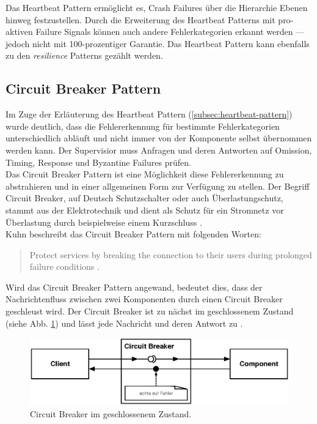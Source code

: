Das Heartbeat Pattern ermöglicht es, Crash Failures über die Hierarchie Ebenen hinweg festzustellen. Durch die Erweiterung des Heartbeat Patterns mit pro-aktiven Failure Signals können auch andere Fehlerkategorien erkannt werden --- jedoch nicht mit 100-prozentiger Garantie. Das Heartbeat Pattern kann ebenfalls zu den \textit{resilience} Patterns gezählt werden. 

\pagebreak

\subsection{Circuit Breaker Pattern}\label{subsec:circuit-breaker-pattern}
Im Zuge der Erläuterung des Heartbeat Pattern (\ref{subsec:heartbeat-pattern}) wurde deutlich, dass die Fehlererkennung für bestimmte Fehlerkategorien unterschiedlich abläuft und nicht immer von der Komponente selbst übernommen werden kann. Der Supervisior muss Anfragen und deren Antworten auf Omission, Timing, Response und Byzantine Failures prüfen.\\
Das Circuit Breaker Pattern ist eine Möglichkeit diese Fehlererkennung zu abstrahieren und in einer allgemeinen Form zur Verfügung zu stellen. Der Begriff Circuit Breaker, auf Deutsch Schutzschalter oder auch Überlastungschutz, stammt aus der Elektrotechnik und dient als Schutz für ein Stromnetz vor Überlastung durch beispielweise einem Kurzschluss \cite[S.~93]{nygard_release_2007}.\\
Kuhn beschreibt das Circuit Breaker Pattern mit folgenden Worten:

\begin{quotation}
Protect services by breaking the connection to their users during prolonged failure conditions \cite[S.~202]{kuhn_reactive_2015}.
\end{quotation}

Wird das Circuit Breaker Pattern angewand, bedeutet dies, dass der Nachrichtenfluss zwischen zwei Komponenten durch einen Circuit Breaker geschleust wird. Der Circuit Breaker ist zu nächst im geschlossenem Zustand (siehe Abb. \ref{fig:circuit-breaker-closed}) und lässt jede Nachricht und deren Antwort zu \cite[S.~93]{nygard_release_2007}.

\begin{figure}[H]
 \centering
 \includegraphics[width=1.0\textwidth]{4-Hauptteil/circuit-breaker/circuit-breaker-closed.eps}
 \caption{Circuit Breaker im geschlossenem Zustand.}
 \label{fig:circuit-breaker-closed}
\end{figure}

